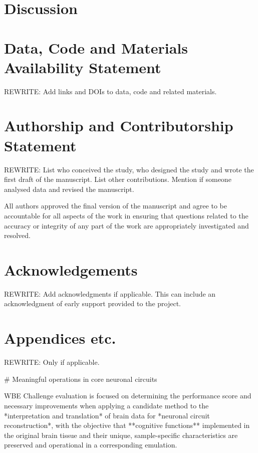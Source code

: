 \documentclass{ldr-article}
\begin{document}
\section{Discussion}


\printbibliography

\section{Data, Code and Materials Availability Statement}

\alert{REWRITE:} Add links and DOIs to data, code and related materials.

\section{Authorship and Contributorship Statement}

\alert{REWRITE:} List who conceived the study, who designed the study and wrote the first draft of the manuscript. List other contributions. Mention if someone analysed data and revised the manuscript.

All authors approved the final version of the manuscript and agree to be accountable for all aspects of the work in ensuring that questions related to the accuracy or integrity of any part of the work are appropriately investigated and resolved.

\section{Acknowledgements}

\alert{REWRITE:} Add acknowledgments if applicable. This can include an acknowledgment of early support provided to the project.

\clearpage
\appendix

\section{Appendices etc.}

\alert{REWRITE:} Only if applicable.

# Meaningful operations in core neuronal circuits

WBE Challenge evaluation is focused on determining the performance score and necessary improvements
when applying a candidate method to the *interpretation and translation* of brain data for *neuronal circuit
reconstruction*, with the objective that **cognitive functions** implemented in the original brain
tissue and their unique, sample-specific characteristics are preserved and operational in a corresponding
emulation.
\end{document}
